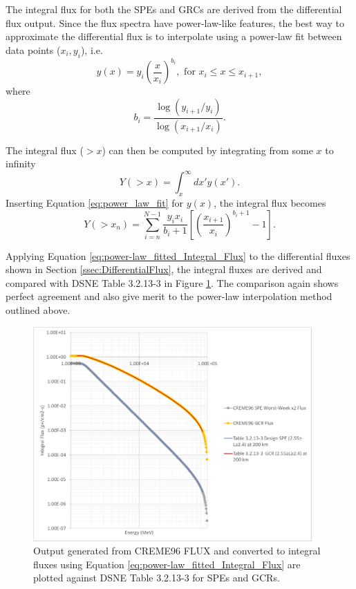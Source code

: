 \documentclass{hitec}
\begin{document}
The integral flux for both the SPEs and GRCs are derived from the differential flux output. Since the flux spectra have power-law-like features, the best way to approximate the differential flux is to interpolate using a power-law fit between data points ($x_i, y_i$), i.e.
\begin{equation}\label{eq:power_law_fit}
	y(x) = y_i\left(\frac{x}{x_i}\right)^{b_i}, \text{ for $x_i \le x \le x_{i+1}$},
\end{equation}
where
\begin{equation}
	b_i = \frac{\log(y_{i+1}/y_i)}{\log(x_{i+1}/x_i)}.
\end{equation}

The integral flux ($>x$) can then be computed by integrating from some $x$ to infinity
\begin{equation}
	Y(>x) = \int_{x}^{\infty}dx'y(x').
\end{equation}
Inserting Equation \eqref{eq:power_law_fit} for $y(x)$, the integral flux becomes
\begin{equation}\label{eq:power-law_fitted_Integral_Flux}
	Y(>x_n) = \sum_{i=n}^{N-1} \frac{y_i x_i}{b_i + 1}\left[\left(\frac{x_{i+1}}{x_i}\right)^{b_i + 1} - 1\right].
\end{equation}

Applying Equation \eqref{eq:power-law_fitted_Integral_Flux} to the differential fluxes shown in Section \ref{ssec:DifferentialFlux}, the integral fluxes are derived and compared with DSNE Table 3.2.13-3 in Figure \ref{fig:DSNE_Integral_Flux_Comparison}. The comparison again shows perfect agreement and also give merit to the power-law interpolation method outlined above.

\begin{figure}[htbp!]
	\centering
	\includegraphics[width=0.95\textwidth]{DSNE_Integral_Flux_Comparison.png}
	\caption{Output generated from CREME96 \textsf{FLUX} and converted to integral fluxes using Equation \eqref{eq:power-law_fitted_Integral_Flux} are plotted against DSNE Table 3.2.13-3 for SPEs and GCRs.}\label{fig:DSNE_Integral_Flux_Comparison}
\end{figure}
\end{document}
